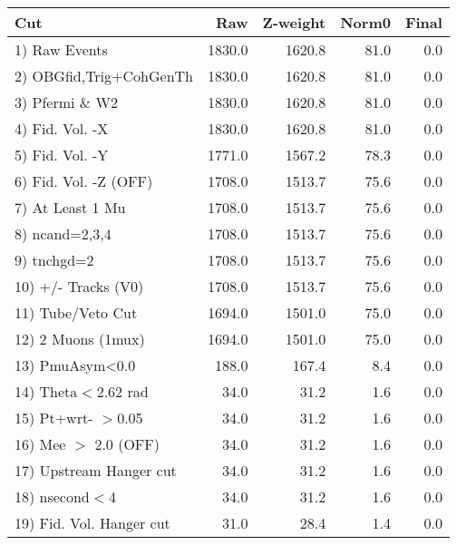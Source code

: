  \begin{table}[h!]\centering
 \begin{tabular}{||l||r|r|r|r||}
 \hline
 \hline
 Cut & Raw & Z-weight & Norm0 & Final \\
 \hline
  1) Raw Events           &      1830.0 &      1620.8 &        81.0 &         0.0 \\
  2) OBGfid,Trig+CohGenTh &      1830.0 &      1620.8 &        81.0 &         0.0 \\
  3) Pfermi \& W2         &      1830.0 &      1620.8 &        81.0 &         0.0 \\
  4) Fid. Vol. -X         &      1830.0 &      1620.8 &        81.0 &         0.0 \\
  5) Fid. Vol. -Y         &      1771.0 &      1567.2 &        78.3 &         0.0 \\
  6) Fid. Vol. -Z (OFF)   &      1708.0 &      1513.7 &        75.6 &         0.0 \\
  7) At Least 1 Mu        &      1708.0 &      1513.7 &        75.6 &         0.0 \\
  8) ncand=2,3,4          &      1708.0 &      1513.7 &        75.6 &         0.0 \\
  9) tnchgd=2             &      1708.0 &      1513.7 &        75.6 &         0.0 \\
 10) +/- Tracks (V0)      &      1708.0 &      1513.7 &        75.6 &         0.0 \\
 11) Tube/Veto Cut        &      1694.0 &      1501.0 &        75.0 &         0.0 \\
 12) 2 Muons (1mux)       &      1694.0 &      1501.0 &        75.0 &         0.0 \\
 13) PmuAsym<0.0          &       188.0 &       167.4 &         8.4 &         0.0 \\
 14) Theta$<$2.62 rad     &        34.0 &        31.2 &         1.6 &         0.0 \\
 15) Pt+wrt- $>$0.05      &        34.0 &        31.2 &         1.6 &         0.0 \\
 16) Mee $>$ 2.0  (OFF)   &        34.0 &        31.2 &         1.6 &         0.0 \\
 17) Upstream Hanger cut  &        34.0 &        31.2 &         1.6 &         0.0 \\
 18) nsecond$<$4          &        34.0 &        31.2 &         1.6 &         0.0 \\
 19) Fid. Vol. Hanger cut &        31.0 &        28.4 &         1.4 &         0.0 \\

\end{tabular}
\end{table}
